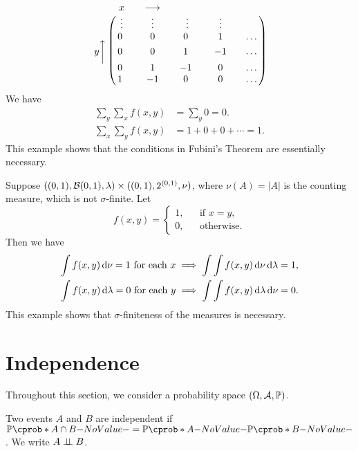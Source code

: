 \documentclass[12pt]{article}
\begin{document}
\begin{Example}
\begin{equation}
\bordermatrix{
& x &&  \longrightarrow \cr
&\vdots && \vdots && \vdots&& \vdots \cr\\
&0\ && 0 && 0 \ && 1 && \ldots \cr\\
y \bigg\uparrow &0\ && 0 && 1 \ && -1 && \ldots \cr\\
&0\ && 1 && -1 \ && 0 && \ldots \cr\\
&1\ && -1 && 0 \ && 0 && \ldots \cr
}
\end{equation}
We have
\begin{align*}
\sum_y \sum_x f(x,y) &= \sum_y 0 = 0.\\
\sum_x \sum_y f(x,y) &= 1+0+0+\cdots = 1.
\end{align*}
This example shows that the conditions in Fubini's Theorem are essentially necessary. 
\end{Example}


\begin{Example}
Suppose $((0,1),\mathcal{B} (0,1),\lambda) \times ((0,1),2^{(0,1)},\nu)$, where $\nu(A)=|A|$ is the counting measure, which is not $\sigma$-finite. Let
\begin{equation}
f(x,y)=\left\{
\begin{aligned}
1, && \text{if } x=y,\\
0, && \text{otherwise.} 
\end{aligned}
\right.
\end{equation}
Then we have
\begin{align*}
\int f(x,y) \,\mathrm{d} \nu = 1 \text{ for each } x \implies \int \int f(x,y) \,\mathrm{d} \nu \,\mathrm{d} \lambda= 1,\\
\int f(x,y) \,\mathrm{d} \lambda = 0 \text{ for each } y \implies \int \int f(x,y) \,\mathrm{d} \lambda \,\mathrm{d} \nu= 0.
\end{align*}
This example shows that $\sigma$-finiteness of the measures is necessary. 
\end{Example}




\section{Independence}

Throughout this section, we consider a probability space $(\Omega,\calA,\P)$.

\begin{Definition}
Two events $A$ and $B$ are independent if $\P(A \cap B) = \P(A)\P(B)$. We write $A \independent B$.
\end{Definition}
\end{document}
